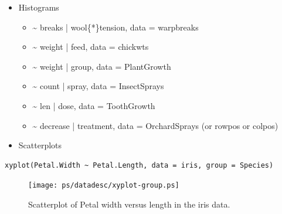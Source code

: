\documentclass[10pt,english]{scrbook}
\begin{document}
\begin{itemize}
\item Histograms
\begin{itemize}
\item \textasciitilde{} breaks | wool\{*\}tension, data = warpbreaks
\item \textasciitilde{} weight | feed, data = chickwts
\item \textasciitilde{} weight | group, data = PlantGrowth
\item \textasciitilde{} count | spray, data = InsectSprays
\item \textasciitilde{} len | dose, data = ToothGrowth
\item \textasciitilde{} decrease | treatment, data = OrchardSprays (or rowpos or colpos)
\end{itemize}

\item Scatterplots
\end{itemize}

\begin{verbatim}
xyplot(Petal.Width ~ Petal.Length, data = iris, group = Species)
\end{verbatim}

\begin{figure}[th]
  \texttt{[image: ps/datadesc/xyplot-group.ps]}
  \caption[Scatterplot of Petal width versus length in the iris data.]{Scatterplot of Petal width versus length in the iris data.}
  \label{fig-xyplot-group}
\end{figure}
\end{document}
